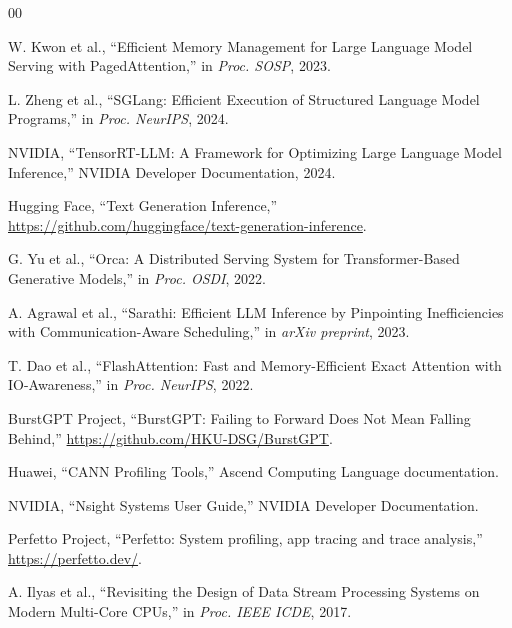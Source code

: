 \documentclass[conference]{IEEEtran}
\begin{document}
\begin{thebibliography}{00}

W. Kwon et al., ``Efficient Memory Management for Large Language Model
Serving with PagedAttention,'' in \emph{Proc. SOSP}, 2023.

L. Zheng et al., ``SGLang: Efficient Execution of Structured Language Model
Programs,'' in \emph{Proc. NeurIPS}, 2024.

NVIDIA, ``TensorRT-LLM: A Framework for Optimizing Large Language Model
Inference,'' NVIDIA Developer Documentation, 2024.

Hugging Face, ``Text Generation Inference,'' \url{https://github.com/huggingface/text-generation-inference}.

G. Yu et al., ``Orca: A Distributed Serving System for Transformer-Based
Generative Models,'' in \emph{Proc. OSDI}, 2022.

A. Agrawal et al., ``Sarathi: Efficient LLM Inference by Pinpointing
Inefficiencies with Communication-Aware Scheduling,'' in \emph{arXiv preprint}, 2023.

T. Dao et al., ``FlashAttention: Fast and Memory-Efficient Exact Attention
with IO-Awareness,'' in \emph{Proc. NeurIPS}, 2022.

BurstGPT Project, ``BurstGPT: Failing to Forward Does Not Mean Falling
Behind,'' \url{https://github.com/HKU-DSG/BurstGPT}.

Huawei, ``CANN Profiling Tools,'' Ascend Computing Language documentation.

NVIDIA, ``Nsight Systems User Guide,'' NVIDIA Developer Documentation.

Perfetto Project, ``Perfetto: System profiling, app tracing and trace
analysis,'' \url{https://perfetto.dev/}.

A. Ilyas et al., ``Revisiting the Design of Data Stream Processing Systems
on Modern Multi-Core CPUs,'' in \emph{Proc. IEEE ICDE}, 2017.

\end{thebibliography}
\end{document}
